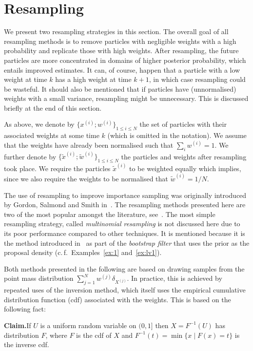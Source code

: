 \section*{Resampling}
We present two resampling strategies in this section. The overall goal
of all resampling methods is to remove particles with negligible
weights with a high probability and replicate those with high
weights. After resampling, the future particles are more concentrated
in domains of higher posterior probability, which entails improved
estimates. It can, of course, happen that a particle with a low weight
at time $k$ has a high weight at time $k+1$, in which case resampling
could be wasteful. It should also be mentioned that if particles have
(unnormalised) weights with a small variance, resampling might be
unnecessary. This is discussed briefly at the end of this section.

As above, we denote by $\{ x^{(i)}; w^{(i)} \}_{1 \le i \le N}$ the
set of particles with their associated weights at some time $k$ (which
is omitted in the notation). We assume that the weights have already
been normalised such that $\sum_i w^{(i)} = 1$. We further denote by
$\{ \tilde{x}^{(i)}; \tilde{w}^{(i)} \}_{1 \le i \le N}$ the particles
and weights after resampling took place. We require the particles
$\tilde{x}^{(i)}$ to be weighted equally which implies, since we also
require the weights to be normalised that $\tilde{w}^{(i)} = 1/N$.

The use of resampling to improve importance sampling was originally
introduced by Gordon, Salmond and Smith in~\cite{gordon}. The
resampling methods presented here are two of the most popular amongst
the literature, see~\cite{douc}. The most simple resampling strategy,
called \emph{multinomial resampling} is not discussed here due to its
poor performance compared to other techniques. It is mentioned because
it is the method introduced in~\cite{gordon} as part of the\emph{
  bootstrap filter} that uses the prior as the proposal density
(c.\,f.\ Examples~\ref{ex:1} and~\ref{ex:lv1}).

Both methods presented in the following are based on drawing samples
from the point mass distribution
$\sum_{j=1}^N w^{(j)} \delta_{X^{(j)}}$. In practice, this is achieved
by repeated uses of the inversion method, which itself uses the
empirical cumulative distribution function (cdf) associated with the
weights. This is based on the following fact:

\textbf{Claim.}\quad If $U$ is a uniform random variable on $(0,1]$
then $X = F^{-1}(U)$ has distribution $F$, where $F$ is the cdf of $X$
and $F^{-1}(t) = \min \{ x \mid F(x) = t \}$ is the inverse cdf.


